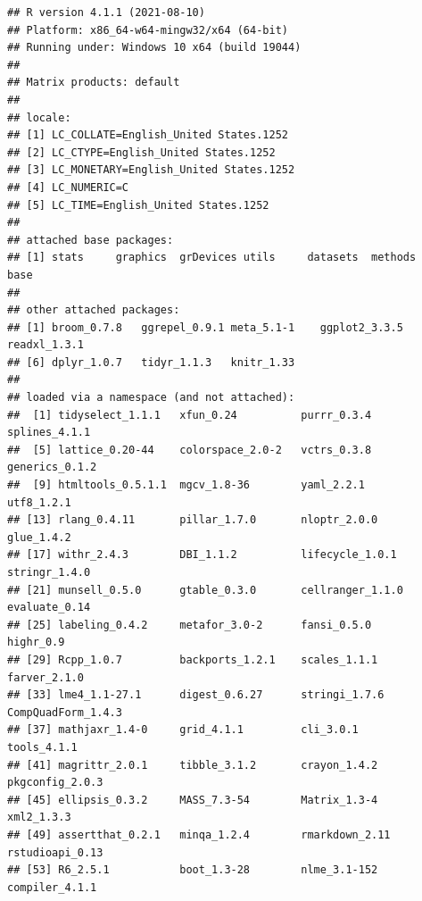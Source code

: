\documentclass[
]{article}
\begin{document}
\begin{verbatim}
## R version 4.1.1 (2021-08-10)
## Platform: x86_64-w64-mingw32/x64 (64-bit)
## Running under: Windows 10 x64 (build 19044)
## 
## Matrix products: default
## 
## locale:
## [1] LC_COLLATE=English_United States.1252 
## [2] LC_CTYPE=English_United States.1252   
## [3] LC_MONETARY=English_United States.1252
## [4] LC_NUMERIC=C                          
## [5] LC_TIME=English_United States.1252    
## 
## attached base packages:
## [1] stats     graphics  grDevices utils     datasets  methods   base     
## 
## other attached packages:
## [1] broom_0.7.8   ggrepel_0.9.1 meta_5.1-1    ggplot2_3.3.5 readxl_1.3.1 
## [6] dplyr_1.0.7   tidyr_1.1.3   knitr_1.33   
## 
## loaded via a namespace (and not attached):
##  [1] tidyselect_1.1.1   xfun_0.24          purrr_0.3.4        splines_4.1.1     
##  [5] lattice_0.20-44    colorspace_2.0-2   vctrs_0.3.8        generics_0.1.2    
##  [9] htmltools_0.5.1.1  mgcv_1.8-36        yaml_2.2.1         utf8_1.2.1        
## [13] rlang_0.4.11       pillar_1.7.0       nloptr_2.0.0       glue_1.4.2        
## [17] withr_2.4.3        DBI_1.1.2          lifecycle_1.0.1    stringr_1.4.0     
## [21] munsell_0.5.0      gtable_0.3.0       cellranger_1.1.0   evaluate_0.14     
## [25] labeling_0.4.2     metafor_3.0-2      fansi_0.5.0        highr_0.9         
## [29] Rcpp_1.0.7         backports_1.2.1    scales_1.1.1       farver_2.1.0      
## [33] lme4_1.1-27.1      digest_0.6.27      stringi_1.7.6      CompQuadForm_1.4.3
## [37] mathjaxr_1.4-0     grid_4.1.1         cli_3.0.1          tools_4.1.1       
## [41] magrittr_2.0.1     tibble_3.1.2       crayon_1.4.2       pkgconfig_2.0.3   
## [45] ellipsis_0.3.2     MASS_7.3-54        Matrix_1.3-4       xml2_1.3.3        
## [49] assertthat_0.2.1   minqa_1.2.4        rmarkdown_2.11     rstudioapi_0.13   
## [53] R6_2.5.1           boot_1.3-28        nlme_3.1-152       compiler_4.1.1
\end{verbatim}
\end{document}
